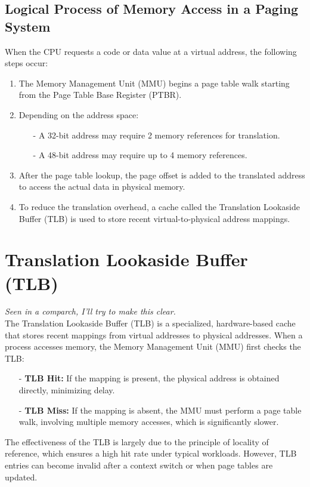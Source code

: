 \subsection{Logical Process of Memory Access in a Paging System}
When the CPU requests a code or data value at a virtual address, the following steps occur:
\begin{enumerate}
    \item The Memory Management Unit (MMU) begins a page table walk starting from the Page Table Base Register (PTBR).
    \item Depending on the address space:
    \begin{itemize}
      \item[-] A 32-bit address may require 2 memory references for translation.
      \item[-] A 48-bit address may require up to 4 memory references.
    \end{itemize}
    \item After the page table lookup, the page offset is added to the translated address to access the actual data in physical memory.
    \item To reduce the translation overhead, a cache called the Translation Lookaside Buffer (TLB) is used to store recent virtual-to-physical address mappings.
\end{enumerate}


\section{Translation Lookaside Buffer (TLB)}
\textit{Seen in a comparch, I'll try to make this clear.}\\

The Translation Lookaside Buffer (TLB) is a specialized, hardware-based cache that stores recent mappings from virtual addresses to physical addresses. When a process accesses memory, the Memory Management Unit (MMU) first checks the TLB:
\begin{itemize}
  \item[-] \textbf{TLB Hit:} If the mapping is present, the physical address is obtained directly, minimizing delay.
  \item[-] \textbf{TLB Miss:} If the mapping is absent, the MMU must perform a page table walk, involving multiple memory accesses, which is significantly slower.
\end{itemize}

The effectiveness of the TLB is largely due to the principle of locality of reference, which ensures a high hit rate under typical workloads. However, TLB entries can become invalid after a context switch or when page tables are updated.

